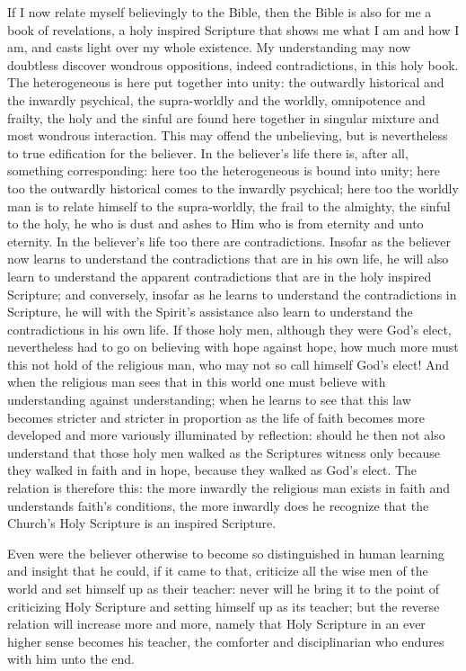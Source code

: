 \documentclass[12pt,a4paper]{book}
\begin{document}
If I now relate myself believingly to the Bible, then the Bible is also for me a
book of revelations, a holy inspired Scripture that shows me what I am and how I
am, and casts light over my whole existence. My understanding may now doubtless
discover wondrous oppositions, indeed contradictions, in this holy book. The
heterogeneous is here put together into unity: the outwardly historical and the
inwardly psychical, the supra-worldly and the worldly, omnipotence and frailty,
the holy and the sinful are found here together in singular mixture and most
wondrous interaction. This may offend the unbelieving, but is nevertheless to
true edification for the believer. In the believer's life there is, after all,
something corresponding: here too the heterogeneous is bound into unity; here too
the outwardly historical comes to the inwardly psychical; here too the worldly
man is to relate himself to the supra-worldly, the frail to the almighty, the
sinful to the holy, he who is dust and ashes to Him who is from eternity and unto
eternity. In the believer's life too there are contradictions. Insofar as the
believer now learns to understand the contradictions that are in his own life, he
will also learn to understand the apparent contradictions that are in the holy
inspired Scripture; and conversely, insofar as he learns to understand the
contradictions in Scripture, he will with the Spirit's assistance also learn to
understand the contradictions in his own
life. If those holy men, although they were God's elect, nevertheless had to go
on believing with hope against hope, how much more must this not hold of the
religious man, who may not so call himself God's elect! And when the religious
man sees that in this world one must believe with understanding against
understanding; when he learns to see that this law becomes stricter and stricter
in proportion as the life of faith becomes more developed and more variously
illuminated by reflection: should he then not also understand that those holy men
walked as the Scriptures witness only because they walked in faith and in hope,
because they walked as God's elect. The relation is therefore this: the more
inwardly the religious man exists in faith and understands faith's conditions, the
more inwardly does he recognize that the Church's Holy Scripture is an inspired
Scripture.

Even were the believer otherwise to become so distinguished in human learning and
insight that he could, if it came to that, criticize all the wise men of the world
and set himself up as their teacher: never will he bring it to the point of
criticizing Holy Scripture and setting himself up as its teacher; but the reverse
relation will increase more and more, namely that Holy Scripture in an ever higher
sense becomes his teacher, the comforter and disciplinarian who endures with him
unto the end.
\end{document}
